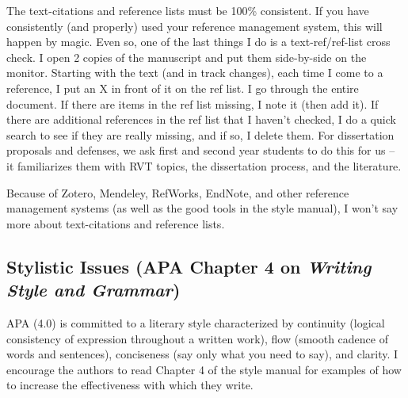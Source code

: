 \documentclass[
  english,
]{book}
\begin{document}
The text-citations and reference lists must be 100\% consistent. If you have consistently (and properly) used your reference management system, this will happen by magic. Even so, one of the last things I do is a text-ref/ref-list cross check. I open 2 copies of the manuscript and put them side-by-side on the monitor. Starting with the text (and in track changes), each time I come to a reference, I put an X in front of it on the ref list. I go through the entire document. If there are items in the ref list missing, I note it (then add it). If there are additional references in the ref list that I haven't checked, I do a quick search to see if they are really missing, and if so, I delete them. For dissertation proposals and defenses, we ask first and second year students to do this for us -- it familiarizes them with RVT topics, the dissertation process, and the literature.

Because of Zotero, Mendeley, RefWorks, EndNote, and other reference management systems (as well as the good tools in the style manual), I won't say more about text-citations and reference lists.

\hypertarget{stylistic-issues-apa-chapter-4-on-writing-style-and-grammar}{%
\subsection{\texorpdfstring{Stylistic Issues (APA Chapter 4 on \emph{Writing Style and Grammar})}{Stylistic Issues (APA Chapter 4 on Writing Style and Grammar)}}\label{stylistic-issues-apa-chapter-4-on-writing-style-and-grammar}}

APA (4.0) is committed to a literary style characterized by continuity (logical consistency of expression throughout a written work), flow (smooth cadence of words and sentences), conciseness (say only what you need to say), and clarity. I encourage the authors to read Chapter 4 of the style manual for examples of how to increase the effectiveness with which they write.
\end{document}

